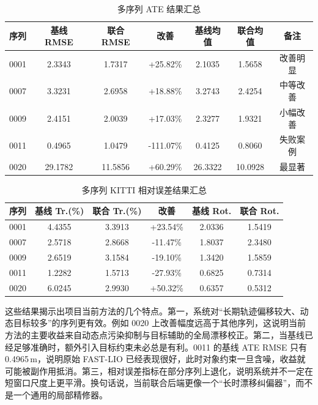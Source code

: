 \documentclass[UTF8,a4paper,12pt]{ctexart}
\begin{document}
\begin{table}[H]
    \centering
    \caption{多序列 ATE 结果汇总}
    \label{tab:ate_multi}
    \begin{tabular}{ccccccc}
        \toprule
        序列 & 基线 RMSE & 联合 RMSE & 改善 & 基线均值 & 联合均值 & 备注 \\
        \midrule
        0001 & 2.3343 & 1.7317 & +25.82\% & 2.1035 & 1.5658 & 改善明显 \\
        0007 & 3.3231 & 2.6958 & +18.88\% & 3.2743 & 2.4254 & 中等改善 \\
        0009 & 2.4151 & 2.0039 & +17.03\% & 2.3277 & 1.9321 & 小幅改善 \\
        0011 & 0.4965 & 1.0479 & -111.07\% & 0.4125 & 0.8060 & 失败案例 \\
        0020 & 29.1782 & 11.5856 & +60.29\% & 26.3322 & 10.0928 & 最显著 \\
        \bottomrule
    \end{tabular}
\end{table}

\begin{table}[H]
    \centering
    \caption{多序列 KITTI 相对误差结果汇总}
    \label{tab:kitti_multi}
    \begin{tabular}{cccccc}
        \toprule
        序列 & 基线 Tr.(\%) & 联合 Tr.(\%) & 改善 & 基线 Rot. & 联合 Rot. \\
        \midrule
        0001 & 4.4355 & 3.3913 & +23.54\% & 2.0336 & 1.5419 \\
        0007 & 2.5718 & 2.8668 & -11.47\% & 1.8037 & 2.3480 \\
        0009 & 2.6519 & 3.1584 & -19.10\% & 1.3420 & 1.5859 \\
        0011 & 1.2282 & 1.5713 & -27.93\% & 0.6825 & 0.7314 \\
        0020 & 6.0245 & 2.9930 & +50.32\% & 0.6357 & 0.5312 \\
        \bottomrule
    \end{tabular}
\end{table}

这些结果揭示出项目当前方法的几个特点。第一，系统对“长期轨迹偏移较大、动态目标较多”的序列更有效。例如 0020 上改善幅度远高于其他序列，这说明当前方法的主要收益来自动态点污染抑制与目标辅助的全局漂移校正。第二，当基线已经足够准确时，额外引入目标约束未必总是有利。0011 的基线 ATE RMSE 只有 0.4965\,m，说明原始 FAST-LIO 已经表现很好，此时对象约束一旦含噪，收益就可能被副作用抵消。第三，相对误差指标在部分序列上退化，说明系统并不一定在短窗口尺度上更平滑。换句话说，当前联合后端更像一个“长时漂移纠偏器”，而不是一个通用的局部精修器。
\end{document}
